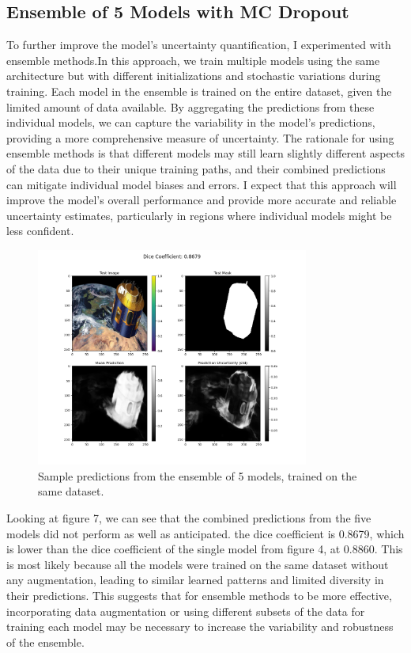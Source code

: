 \documentclass{article}
\begin{document}
\subsection{Ensemble of 5 Models with MC Dropout}

To further improve the model's uncertainty quantification, I experimented with ensemble methods.In this approach, we train 
multiple models using the same architecture but with different initializations and stochastic variations during training. 
Each model in the ensemble is trained on the entire dataset, given the limited amount of data available. By aggregating 
the predictions from these individual models, we can capture the variability in the model's predictions, providing a more 
comprehensive measure of uncertainty. The rationale for using ensemble methods is that different models may still learn 
slightly different aspects of the data due to their unique training paths, and their combined predictions can mitigate 
individual model biases and errors. I expect that this approach will improve the model's overall performance and provide 
more accurate and reliable uncertainty estimates, particularly in regions where individual models might be less confident. 

\begin{figure}[h]
    \centering
    \includegraphics[width=0.8\textwidth]{../images/ensemble method/prediction.png}
    \caption{Sample predictions from the ensemble of 5 models, trained on the same dataset.}
    \label{fig:ensemble_predictions}
\end{figure}

\vspace{1em}
Looking at figure 7, we can see that the combined predictions from the five models did not perform as well as anticipated. 
the dice coefficient is 0.8679, which is lower than the dice coefficient of the single model from figure 4, at 0.8860.
This is most likely because all the models were trained on the same dataset without any augmentation, leading to similar 
learned patterns and limited diversity in their predictions. This suggests that for ensemble methods to be more effective, 
incorporating data augmentation or using different subsets of the data for training each model may be necessary to increase 
the variability and robustness of the ensemble.
\end{document}
